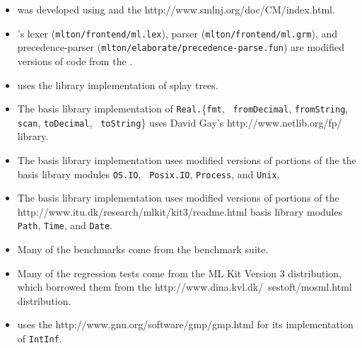 \begin{itemize}

\item
{\mlton} was developed using
and the
		  {http://www.smlnj.org/doc/CM/index.html}.

\item
{\mlton}'s lexer ({\tt mlton/frontend/ml.lex}), 
parser ({\tt mlton/frontend/ml.grm}),
and precedence-parser ({\tt mlton/elaborate/precedence-parse.fun})
are modified versions of code from the {\smlnj}.

\item
{\mlton} uses the {\smlnj} library implementation of splay trees.

\item
The {\mlton} basis library implementation of {\tt Real.}\{{\tt fmt}, {\tt
fromDecimal}, {\tt fromString}, {\tt scan}, {\tt toDecimal}, {\tt
toString}\} uses David Gay's
		  {http://www.netlib.org/fp/}
library.

\item
The {\mlton} basis library implementation uses modified versions of
portions of the the {\smlnj} basis library modules {\tt OS.IO}, {\tt
Posix.IO}, {\tt Process}, and {\tt Unix}.

\item
The {\mlton} basis library implementation uses modified versions of
portions of the
		  {http://www.itu.dk/research/mlkit/kit3/readme.html}
basis library modules {\tt Path}, {\tt Time}, and {\tt Date}.

\item
Many of the benchmarks come from the {\smlnj} benchmark suite.

\item
Many of the regression tests come from the ML Kit Version 3 distribution, which
borrowed them from the
		  {http://www.dina.kvl.dk/~sestoft/mosml.html}
distribution.

\item
{\mlton} uses the
		  {http://www.gnu.org/software/gmp/gmp.html}
for its implementation of {\tt IntInf}.

\end{itemize}
